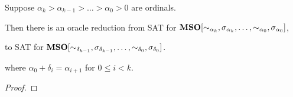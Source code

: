 \begin{theorem}
  Suppose $\alpha_k > \alpha_{k - 1} > \ldots > \alpha_0 > 0$ are ordinals.

  Then there is an oracle reduction from SAT for $\mathbf{MSO}[
    \sim_{\alpha_k}, \sigma_{\alpha_k}, \ldots, \sim_{\alpha_0}, \sigma_{\alpha_0}]$,

  to SAT for $\mathbf{MSO}[
    \sim_{\delta_{k-1}}, \sigma_{\delta_{k-1}}, \ldots, \sim_{\delta_0}, \sigma_{\delta_0}]$.

  where $\alpha_0 + \delta_i = \alpha_{i + 1}$ for $0 \le i < k$.
\end{theorem}

\begin{proof}
  
\end{proof}
